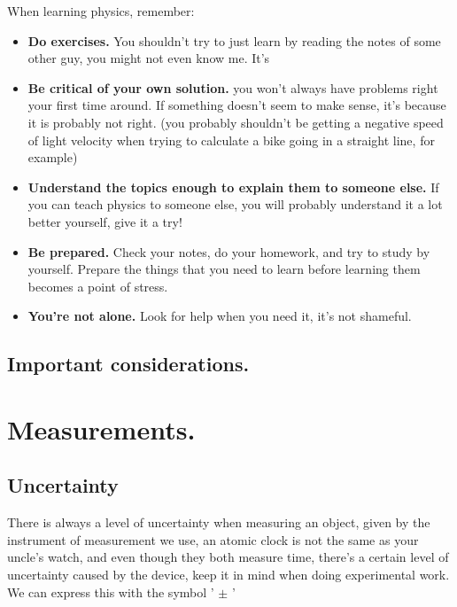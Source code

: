 \documentclass[11pt,fleqn]{book} %
\begin{document}
When learning physics, remember:
\begin{itemize}
    \item \textbf{Do exercises.} You shouldn't try to just learn by reading the notes of some other
    guy, you might not even know me. It's 
    \item \textbf{Be critical of your own solution.} you won't always have problems right your first time
    around. If something doesn't seem to make sense, it's because it is probably not right. 
    (you probably shouldn't be getting a negative speed of light velocity when trying to calculate a bike going in a
    straight line, for example)
    \item \textbf{Understand the topics enough to explain them to someone else.} If you can teach physics to
    someone else, you will probably understand it a lot better yourself, give it a try!
    \item \textbf{Be prepared.} Check your notes, do your homework, and try to study by yourself. Prepare the things that
    you need to learn before learning them becomes a point of stress.
    \item \textbf{You're not alone.} Look for help when you need it, it's not shameful.
\end{itemize}

\vspace{20px}

\section{Important considerations.}


\chapter{Measurements.}



\section{Uncertainty}

There is always a level of uncertainty when measuring an object, given by the instrument of
measurement we use, an atomic clock is not the same as your uncle's watch, and even though they both
measure time, there's a certain level of uncertainty caused by the device, keep it in mind when doing experimental
work. We can express this with the symbol ' $\pm$ '
\end{document}
